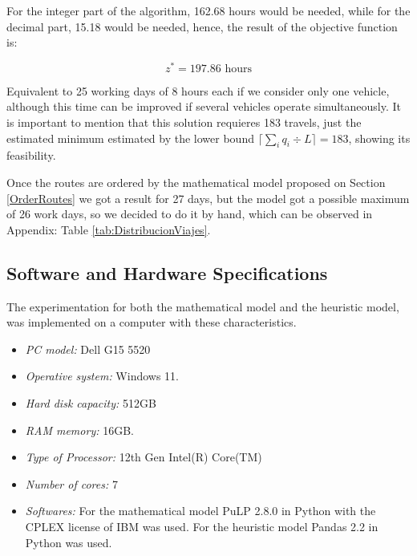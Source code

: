 \documentclass{amsart}
\begin{document}
            For the integer part of the algorithm, 162.68 hours would be needed, while for the decimal part, 15.18 would be needed, hence, the result of the objective function is:
            
            $$z^* = 197.86 \text{ hours}$$

            Equivalent to 25 working days of 8 hours each if we consider only one vehicle, although this time can be improved if several vehicles operate simultaneously. It is important to mention that this solution requieres 183 travels, just the estimated minimum estimated by the lower bound $\lceil \sum_{i} q_i \div L \rceil = 183$, showing its feasibility.
            
            Once the routes are ordered by the mathematical model proposed on Section \ref{OrderRoutes} we got a result for 27 days, but the model got a possible maximum of 26 work days, so we decided to do it by hand, which can be observed in Appendix: Table \ref{tab:DistribucionViajes}.
       
            \subsection{Software and Hardware Specifications}
            
            The experimentation for both the mathematical model and the heuristic model, was implemented on a computer with these characteristics.
    
            \begin{itemize}
                \item \textit{PC model:} Dell G15 5520
                \item \textit{Operative system:} Windows 11.
                \item \textit{Hard disk capacity:} 512GB
                \item \textit{RAM memory:} 16GB.
                \item \textit{Type of Processor:} 12th Gen Intel(R) Core(TM)
                \item \textit{Number of cores:} 7
                \item \textit{Softwares:} For the mathematical model PuLP 2.8.0 in Python with the CPLEX license of IBM was used. For the heuristic model Pandas 2.2 in Python was used.
            \end{itemize}



    
    
\end{document}
